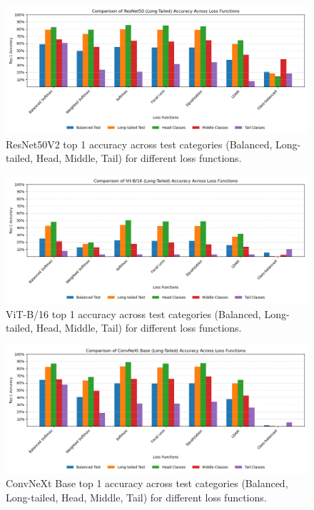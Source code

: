 \begin{figure}[h!]
    \centering
    \includegraphics[width=\textwidth]{Images/Plots/resnet_lt_loss_comparison.png}
    \caption{ResNet50V2 top 1 accuracy across test categories (Balanced, Long-tailed, Head, Middle, Tail) for different loss functions.}
    \label{fig:resnet_lt_loss_comparison}
\end{figure}

\begin{figure}[h!]
    \centering
    \includegraphics[width=\textwidth]{Images/Plots/vit_lt_loss_comparison.png}
    \caption{ViT-B/16 top 1 accuracy across test categories (Balanced, Long-tailed, Head, Middle, Tail) for different loss functions.}
    \label{fig:vit_lt_loss_comparison}
\end{figure}

\begin{figure}[h!]
    \centering
    \includegraphics[width=\textwidth]{Images/Plots/convnext_lt_loss_comparison.png}
    \caption{ConvNeXt Base top 1 accuracy across test categories (Balanced, Long-tailed, Head, Middle, Tail) for different loss functions.}
    \label{fig:conv_lt_loss_comparison}
\end{figure}

